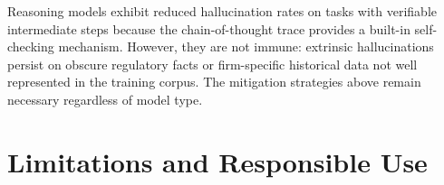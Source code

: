\begin{context}
\begin{remark}
Reasoning models exhibit reduced hallucination rates on tasks with verifiable
intermediate steps because the chain-of-thought trace provides a built-in
self-checking mechanism.  However, they are not immune: extrinsic hallucinations
persist on obscure regulatory facts or firm-specific historical data not well
represented in the training corpus.  The mitigation strategies above remain
necessary regardless of model type.
\end{remark}

\end{context}

\section{Limitations and Responsible Use}
\label{sec:limitations}

